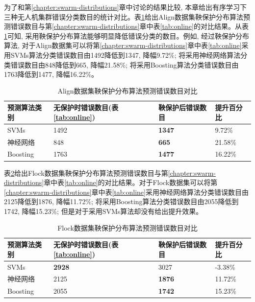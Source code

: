 为了和第\ref{chapter:swarm-distributions}章中讨论的结果比较, 本章给出有序学习下三种无人机集群错误分类数目的统计对比。表\ref{tab:align-num-martingale}给出Align数据集鞅保护分布算法预测错误数目与第\ref{chapter:swarm-distributions}章中表\ref{tab:online}的对比结果。从表\ref{tab:align-num-martingale}可知, 采用鞅保护分布算法能够明显降低错误分类的数目。例如, 经过鞅保护分布算法, 对于Align数据集可以将第\ref{chapter:swarm-distributions}章中表\ref{tab:online}采用SVMs算法分类错误数目由1492降低到1347, 降幅9.72\%; 将采用神经网络算法分类错误数目由848降低到665, 降幅21.58\%; 将采用Boosting算法分类错误数目由1763降低到1477, 降幅16.22\%。

\begin{table}[]
\centering
\caption{Align数据集鞅保护分布算法预测错误数目对比}
\label{tab:align-num-martingale}
\begin{tabular}{@{}llll@{}}
\toprule
预测算法类别   & 无保护时错误数目(表\ref{tab:online}) & 鞅保护后错误数目 & 提升百分比 \\ \midrule
SVMs     & 1492          & \textbf{1347}      &       {9.72\%}\\
神经网络     & 848           & \textbf{665}      &     {21.58\%} \\
Boosting & 1763          & \textbf{1477}     &       {16.22\%} \\ \bottomrule
\end{tabular}%
\end{table}

表\ref{tab:flock-num-martingale}给出Flock数据集鞅保护分布算法预测错误数目与第\ref{chapter:swarm-distributions}章中表\ref{tab:online}的对比结果。对于Flock数据集可以将第\ref{chapter:swarm-distributions}章中表\ref{tab:online}采用神经网络算法分类错误数目由2125降低到1876, 降幅11.72\%; 将采用Boosting算法分类错误数目由2055降低到1742, 降幅15.23\%; 但是对于采用SVMs算法却没有给出提升效果。

\begin{table}[]
\centering
\caption{Flock数据集鞅保护分布算法预测错误数目对比}
\label{tab:flock-num-martingale}
\begin{tabular}{@{}llll@{}}
\toprule
预测算法类别   & 无保护时错误数目(表\ref{tab:online}) & 鞅保护后错误数目 & 提升百分比 \\ \midrule
SVMs     & \textbf{2928}          & 3027      &       {-3.38\%}\\
神经网络     & 2125           & \textbf{1876}      &     {11.72\%}  \\
Boosting & 2055          & \textbf{1742}     &       {15.23\%} \\ \bottomrule
\end{tabular}%
\end{table}


